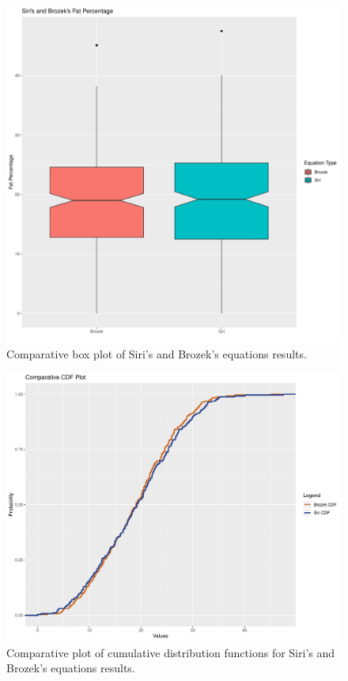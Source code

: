 \documentclass[11pt,american,american]{article}
\begin{document}
\newpage

\begin{figure}[H]
	\centering
	\includegraphics[width=0.7\linewidth]{Images/FIGURES/fat_percentage_boxplot}
	\caption{Comparative box plot of Siri's and Brozek's equations results.}
	\label{fig:fat_percentage_boxplot}
\end{figure}

\begin{figure}[H]
	\centering
	\includegraphics[width=0.75\linewidth]{Images/FIGURES/cdf_brozek_siri}
	\caption{Comparative plot of cumulative distribution functions for Siri's and Brozek's equations results.}
	\label{fig:cdf_brozek_siri}
\end{figure}

\newpage
\end{document}
